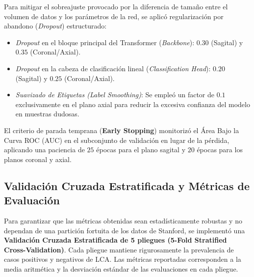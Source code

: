 Para mitigar el sobreajuste provocado por la diferencia de tamaño entre el volumen de datos y los parámetros de la red, se aplicó regularización por abandono (\textit{Dropout}) estructurado:
\begin{itemize}
    \item \textit{Dropout} en el bloque principal del Transformer (\textit{Backbone}): $0.30$ (Sagital) y $0.35$ (Coronal/Axial).
    \item \textit{Dropout} en la cabeza de clasificación lineal (\textit{Classification Head}): $0.20$ (Sagital) y $0.25$ (Coronal/Axial).
    \item \textit{Suavizado de Etiquetas (Label Smoothing)}: Se empleó un factor de $0.1$ exclusivamente en el plano axial para reducir la excesiva confianza del modelo en muestras dudosas.
\end{itemize}

El criterio de parada temprana (\textbf{Early Stopping}) monitorizó el Área Bajo la Curva ROC (AUC) en el subconjunto de validación en lugar de la pérdida, aplicando una paciencia de $25$ épocas para el plano sagital y $20$ épocas para los planos coronal y axial.

\subsection{Validación Cruzada Estratificada y Métricas de Evaluación}
Para garantizar que las métricas obtenidas sean estadísticamente robustas y no dependan de una partición fortuita de los datos de Stanford, se implementó una \textbf{Validación Cruzada Estratificada de 5 pliegues (5-Fold Stratified Cross-Validation)}. Cada pliegue mantiene rigurosamente la prevalencia de casos positivos y negativos de LCA. Las métricas reportadas corresponden a la media aritmética y la desviación estándar de las evaluaciones en cada pliegue.

